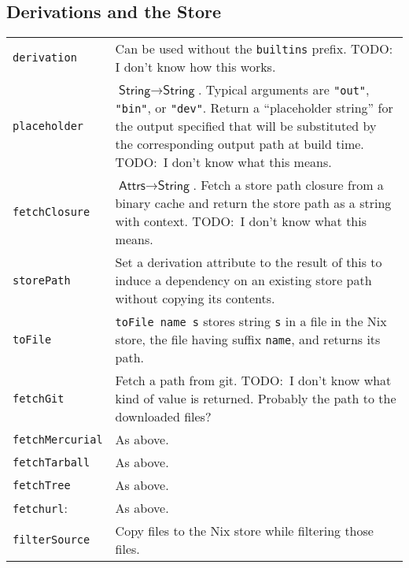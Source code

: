 \documentclass[9pt, a4paper, landscape]{extarticle}
\newcommand{\cmd}[1]{\texttt{#1}}
\newcommand{\str}{\textsf{String}}
\newcommand{\ats}{\textsf{Attrs}}
\begin{document}
\begin{multicols*}{3}

\subsection*{Derivations and the Store}

\begin{tabularx}{\columnwidth}{@{}l>{\raggedright\arraybackslash}X@{}}
  \cmd{derivation} & Can be used without the \cmd{builtins}
                     prefix. TODO: I don't know how this works. \\
  \cmd{placeholder} & $\str\to\str$. Typical arguments are \cmd{"out"},
                      \cmd{"bin"}, or \cmd{"dev"}. Return a ``placeholder string'' for
                      the output specified that will be substituted by
                      the corresponding output path at build
                      time. TODO:\ I don't know what this means. \\
  
  \cmd{fetchClosure} & $\ats\to\str$. Fetch a store path closure from a
                       binary cache and return the store path as a string with
                       context. TODO:\ I don't know what this means. \\
  \cmd{storePath} & Set a derivation attribute to the result of this
                    to induce a dependency on an existing store path
                    without copying its contents. \\
  \cmd{toFile} & \cmd{toFile name s} stores string \cmd{s} in a file
                 in the Nix store, the file having suffix \cmd{name},
                 and returns its path.  \\
                 
  \cmd{fetchGit} & Fetch a path from git. TODO:\ I don't know what
                   kind of value is returned. Probably the path to
                   the downloaded files? \\

  \cmd{fetchMercurial} & As above. \\
  \cmd{fetchTarball} & As above. \\
  \cmd{fetchTree} & As above. \\ 
  \cmd{fetchurl}: & As above. \\

  \cmd{filterSource} & Copy files to the Nix store while filtering
                       those files. \\
  

\end{tabularx}
\end{multicols*}
\end{document}
